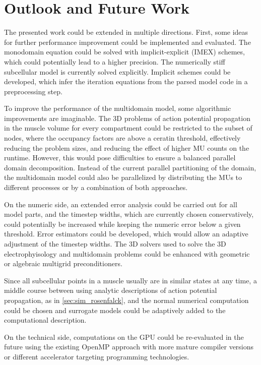 
\section{Outlook and Future Work}\label{sec:future_work}
 
The presented work could be extended in multiple directions.
First, some ideas for further performance improvement could be implemented and evaluated. 
The monodomain equation could be solved with implicit-explicit (IMEX) schemes, which could potentially lead to a higher precision. 
The numerically stiff subcellular model is currently solved explicitly. Implicit schemes could be developed, which infer the iteration equations from the parsed model code in a preprocessing step. 

To improve the performance of the multidomain model, some algorithmic improvements are imaginable. 
The 3D problems of action potential propagation in the muscle volume for every compartment could be restricted to the subset of nodes, where the occupancy factors are above a ceratin threshold, effectively reducing the problem sizes, and reducing the effect of higher MU counts on the runtime. However, this would pose difficulties to ensure a balanced parallel domain decomposition.
Instead of the current parallel partitioning of the domain, the multidomain model could also be parallelized by distributing the MUs to different processes or by a combination of both approaches.

On the numeric side, an extended error analysis could be carried out for all model parts, and the timestep widths, which are currently chosen conservatively, could potentially be increased while keeping the numeric error below a given threshold. Error estimators could be developed, which would allow an adaptive adjustment of the timestep widths.
The 3D solvers used to solve the 3D electrophyisology and multidomain problems could be enhanced with geometric or algebraic multigrid preconditioners.

Since all subcellular points in a muscle usually are in similar states at any time, a middle course between using analytic descriptions of action potential propagation, as in \cref{sec:sim_rosenfalck}, and the normal numerical computation could be chosen and surrogate models could be adaptively added to the computational description.

On the technical side, computations on the GPU could be re-evaluated in the future using the existing OpenMP approach with more mature compiler versions or different accelerator targeting programming technologies.

